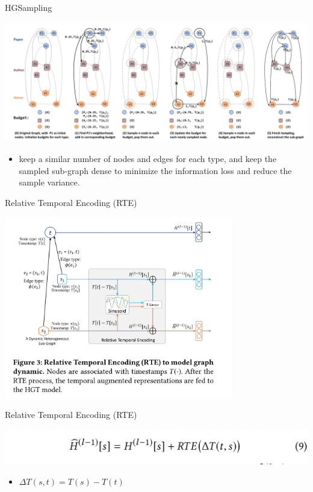\documentclass[aspectratio=1610,hyperref={colorlinks,unicode,linkcolor=blue,anchorcolor=blue,citecolor=blue,filecolor=black,urlcolor=blue}]{beamer}
\begin{document}
\begin{frame}[label={sec:org2d456c3}]{HGSampling}
\begin{center}
\includegraphics[width=.9\linewidth]{./p7.png}
\end{center}

\begin{itemize}
\item keep a similar number of nodes and edges for each type, and keep the
sampled sub-graph dense to minimize the information loss and reduce
the sample variance.
\end{itemize}
\end{frame}

\begin{frame}[label={sec:org1d74f83}]{Relative Temporal Encoding (RTE)}
\begin{center}
\includegraphics[width=10cm]{./p8.png}
\end{center}
\end{frame}

\begin{frame}[label={sec:org5640f02}]{Relative Temporal Encoding (RTE)}
\begin{center}
\includegraphics[width=.9\linewidth]{./p8-2.png}
\end{center}

\begin{itemize}
\item \(\Delta T(s, t) = T(s) - T(t)\)
\end{itemize}
\end{frame}
\end{document}
